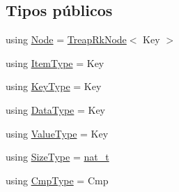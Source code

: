 \subsection*{Tipos públicos}
\begin{DoxyCompactItemize}
\item 
using \hyperlink{class_designar_1_1_tree_set_a7409a9c1545c0e9e2fd6b84120713c99}{Node} = \hyperlink{class_designar_1_1_treap_rk_node}{Treap\+Rk\+Node}$<$ Key $>$
\item 
using \hyperlink{class_designar_1_1_tree_set_a3d4237612f151579b02ff5c7735df07a}{Item\+Type} = Key
\item 
using \hyperlink{class_designar_1_1_tree_set_a28d9821de526b7d05f199b2d5d308335}{Key\+Type} = Key
\item 
using \hyperlink{class_designar_1_1_tree_set_a14a0b2c4c9e4db09003126217094bfe8}{Data\+Type} = Key
\item 
using \hyperlink{class_designar_1_1_tree_set_ab913d8de65b88abb61139cc3880ffe2d}{Value\+Type} = Key
\item 
using \hyperlink{class_designar_1_1_tree_set_a9a4926aa5faab169012a173c8cf5e4bb}{Size\+Type} = \hyperlink{namespace_designar_aa72662848b9f4815e7bf31a7cf3e33d1}{nat\+\_\+t}
\item 
using \hyperlink{class_designar_1_1_tree_set_a556e79c8fffe1f172a60848942672fa7}{Cmp\+Type} = Cmp
\end{DoxyCompactItemize}

